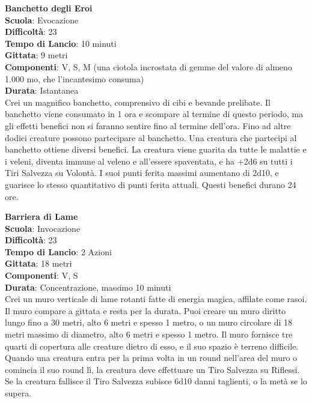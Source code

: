 \begin{multicols}{2}
\medskip\textbf{Banchetto degli Eroi}\\
\textbf{Scuola}: Evocazione\\
\textbf{Difficoltà}:  23\\
\textbf{Tempo di Lancio}: 10 minuti\\
\textbf{Gittata}: 9 metri\\
\textbf{Componenti}: V, S, M (una ciotola incrostata di gemme del valore di almeno 1.000 mo, che l'incantesimo consuma)\\
\textbf{Durata}: Istantanea\\
Crei un magnifico banchetto, comprensivo di cibi e bevande prelibate. Il banchetto viene consumato in 1 ora e scompare al termine di questo periodo, ma gli effetti benefici non si faranno sentire fino al termine dell'ora. Fino ad altre dodici creature possono
partecipare al banchetto. Una creatura che partecipi al banchetto ottiene diversi benefici. La creatura viene guarita da tutte le malattie e i veleni, diventa immune al veleno e all'essere
spaventata, e ha +2d6 su tutti i Tiri Salvezza su Volontà. I suoi punti ferita massimi aumentano di 2d10, e guarisce lo stesso quantitativo di punti ferita attuali. Questi benefici durano 24 ore. 

\medskip\textbf{Barriera di Lame}\\
\textbf{Scuola}: Invocazione\\
\textbf{Difficoltà}:  23\\
\textbf{Tempo di Lancio}: 2 Azioni\\
\textbf{Gittata}: 18 metri\\
\textbf{Componenti}: V, S\\
\textbf{Durata}: Concentrazione, massimo 10 minuti \\
Crei un muro verticale di lame rotanti fatte di energia magica, affilate come rasoi. Il muro compare a gittata e resta per la durata. Puoi creare un muro diritto lungo fino a 30 metri, alto 6 metri e spesso 1 metro, o un muro circolare di 18 metri massimo di diametro, alto 6 metri e spesso 1 metro. Il muro fornisce tre quarti di copertura alle creature dietro di esso, e il suo spazio è terreno difficile. \\
Quando una creatura entra per la prima volta in un round nell'area del muro o comincia il suo round lì, la creatura deve effettuare un Tiro Salvezza su Riflessi. Se la creatura fallisce il Tiro Salvezza subisce 6d10 danni taglienti, o la metà se lo supera.


\end{multicols}
